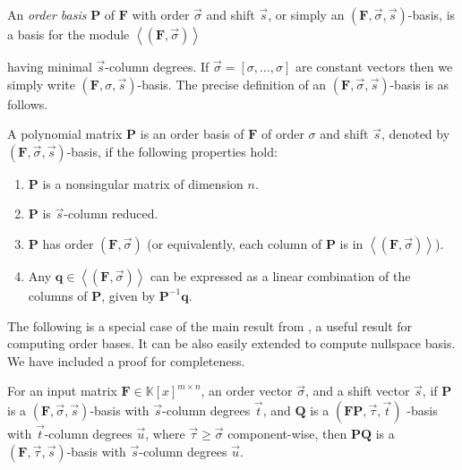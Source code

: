 An \emph{order basis} \citep{BeLa94,BL1997} $\mathbf{P}$ of $\mathbf{F}$
with order $\vec{\sigma}$ and shift $\vec{s}$, or simply an $\left(\mathbf{F},\vec{\sigma},\vec{s}\right)$-basis,
is a basis for the module $\left\langle \left(\mathbf{F},\vec{\sigma}\right)\right\rangle $
\begin{comment}
\[
\left\langle \left(\mathbf{F},\vec{\sigma}\right)\right\rangle =\{\mathbf{p}\in\mathbb{K}\left[x\right]^{n\times1}\|\mathbf{F}\cdot\mathbf{p}=x^{\vec{\sigma}}\mathbf{r},\mathbf{r}\in\mathbb{K}[[x]]^{m\times1}\}
\]
\end{comment}
{} having minimal $\vec{s}$-column degrees. If $\vec{\sigma}=\left[\sigma,\dots,\sigma\right]$
are constant vectors then we simply write $\left(\mathbf{F},\sigma,\vec{s}\right)$-basis.
The precise definition of an $\left(\mathbf{F},\vec{\sigma},\vec{s}\right)$-basis
is as follows.
\begin{defn}
A polynomial matrix $\mathbf{P}$ is an order basis of $\mathbf{F}$
of order $\sigma$ and shift $\vec{s}$, denoted by $\left(\mathbf{F},\vec{\sigma},\vec{s}\right)$-basis,
if the following properties hold:
\begin{enumerate}
\item $\mathbf{P}$ is a nonsingular matrix of dimension $n$.
\item $\mathbf{P}$ is $\vec{s}$-column reduced. 
\item $\mathbf{P}$ has order $\left(\mathbf{F},\vec{\sigma}\right)$ (or
equivalently, each column of $\mathbf{P}$ is in $\left\langle (\mathbf{F},\vec{\sigma})\right\rangle $). 
\item Any $\mathbf{q}\in\left\langle \left(\mathbf{F},\vec{\sigma}\right)\right\rangle $
can be expressed as a linear combination of the columns of $\mathbf{P}$,
given by $\mathbf{P}^{-1}\mathbf{q}$. 
\end{enumerate}
\end{defn}
The following is a special case of the main result from \citep{BL1997},
a useful result for computing order bases. It can be also easily extended
to compute nullspace basis. We have included a proof for completeness.
\begin{lem}
For an input matrix $\mathbf{F}\in\mathbb{K}\left[x\right]^{m\times n}$,
an order vector $\vec{\sigma}$, and a shift vector $\vec{s}$, if
$\mathbf{P}$ is a $\left(\mathbf{F},\vec{\sigma},\vec{s}\right)$-basis
with $\vec{s}$-column degrees $\vec{t}$, and $\mathbf{Q}$ is a
$(\mathbf{F}\mathbf{P},\vec{\tau},\vec{t})$ -basis with $\vec{t}$-column
degrees $\vec{u}$, where $\vec{\tau}\ge\vec{\sigma}$ component-wise,
then $\mathbf{P}\mathbf{Q}$ is a $(\mathbf{F},\vec{\tau},\vec{s})$-basis
with $\vec{s}$-column degrees $\vec{u}$.\end{lem}

